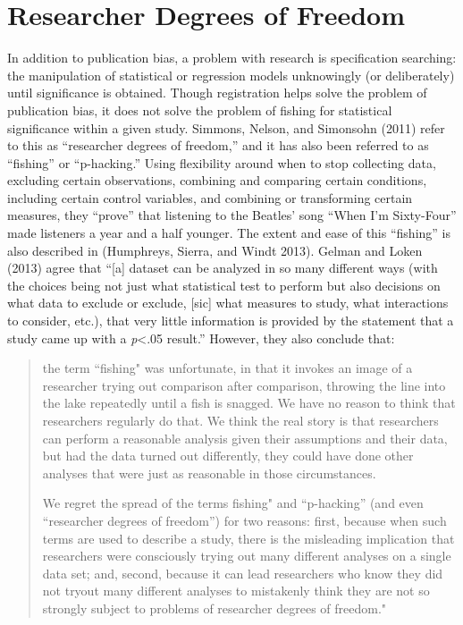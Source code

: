 \documentclass[12pt] {article}
\begin{document}
\section{Researcher Degrees of
Freedom}\label{rdof}

In addition to publication bias, a problem with research is
specification searching: the manipulation of statistical or regression
models unknowingly (or deliberately) until significance is obtained.
Though registration helps solve the problem of publication bias, it does
not solve the problem of fishing for statistical significance within a
given study. Simmons, Nelson, and Simonsohn (2011) refer to this as
``researcher degrees of freedom,'' and it has also been referred to as
``fishing'' or ``p-hacking.'' Using flexibility around when to stop
collecting data, excluding certain observations, combining and comparing
certain conditions, including certain control variables, and combining
or transforming certain measures, they ``prove'' that listening to the
Beatles' song ``When I'm Sixty-Four'' made listeners a year and a half
younger. The extent and ease of this ``fishing'' is also described in
(Humphreys, Sierra, and Windt 2013). Gelman and Loken (2013) agree that
``{[}a{]} dataset can be analyzed in so many different ways (with the
choices being not just what statistical test to perform but also
decisions on what data to exclude or exclude, {[}sic{]} what measures to
study, what interactions to consider, etc.), that very little
information is provided by the statement that a study came up with a
\emph{p}\textless{}.05 result.'' However, they also conclude that:

\begin{quote}
the term ``fishing" was unfortunate, in that it invokes an image of a
researcher trying out comparison after comparison, throwing the line
into the lake repeatedly until a fish is snagged. We have no reason to
think that researchers regularly do that. We think the real story is
that researchers can perform a reasonable analysis given their
assumptions and their data, but had the data turned out differently,
they could have done other analyses that were just as reasonable in
those circumstances.

We regret the spread of the terms fishing" and ``p-hacking'' (and even
``researcher degrees of freedom'') for two reasons: first, because when
such terms are used to describe a study, there is the misleading
implication that researchers were consciously trying out many different
analyses on a single data set; and, second, because it can lead
researchers who know they did not tryout many different analyses to
mistakenly think they are not so strongly subject to problems of
researcher degrees of freedom."
\end{quote}
\end{document}
